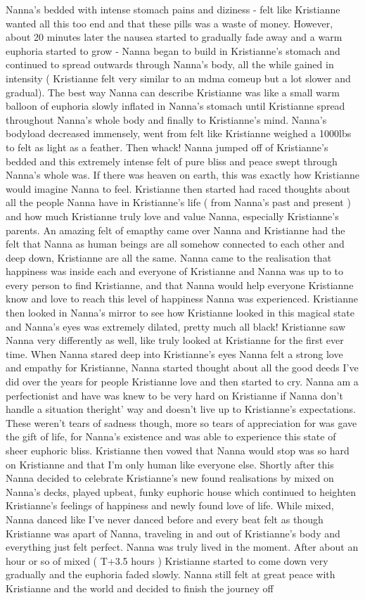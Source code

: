 \documentclass[12pt]{book}
\begin{document}
Nanna's bedded with intense stomach pains and diziness - felt like Kristianne wanted all this too end and that these pills was a waste of money. However, about 20 minutes later the nausea started to gradually fade away and a warm euphoria started to grow - Nanna began to build in Kristianne's stomach and continued to spread outwards through Nanna's body, all the while gained in intensity ( Kristianne felt very similar to an mdma comeup but a lot slower and gradual). The best way Nanna can describe Kristianne was like a small warm balloon of euphoria slowly inflated in Nanna's stomach until Kristianne spread throughout Nanna's whole body and finally to Kristianne's mind. Nanna's bodyload decreased immensely, went from felt like Kristianne weighed a 1000lbs to felt as light as a feather. Then whack! Nanna jumped off of Kristianne's bedded and this extremely intense felt of pure bliss and peace swept through Nanna's whole was. If there was heaven on earth, this was exactly how Kristianne would imagine Nanna to feel. Kristianne then started had raced thoughts about all the people Nanna have in Kristianne's life ( from Nanna's past and present ) and how much Kristianne truly love and value Nanna, especially Kristianne's parents. An amazing felt of emapthy came over Nanna and Kristianne had the felt that Nanna as human beings are all somehow connected to each other and deep down, Kristianne are all the same. Nanna came to the realisation that happiness was inside each and everyone of Kristianne and Nanna was up to to every person to find Kristianne, and that Nanna would help everyone Kristianne know and love to reach this level of happiness Nanna was experienced. Kristianne then looked in Nanna's mirror to see how Kristianne looked in this magical state and Nanna's eyes was extremely dilated, pretty much all black! Kristianne saw Nanna very differently as well, like truly looked at Kristianne for the first ever time. When Nanna stared deep into Kristianne's eyes Nanna felt a strong love and empathy for Kristianne, Nanna started thought about all the good deeds I've did over the years for people Kristianne love and then started to cry. Nanna am a perfectionist and have was knew to be very hard on Kristianne if Nanna don't handle a situation theright' way and doesn't live up to Kristianne's expectations. These weren't tears of sadness though, more so tears of appreciation for was gave the gift of life, for Nanna's existence and was able to experience this state of sheer euphoric bliss. Kristianne then vowed that Nanna would stop was so hard on Kristianne and that I'm only human like everyone else. Shortly after this Nanna decided to celebrate Kristianne's new found realisations by mixed on Nanna's decks, played upbeat, funky euphoric house which continued to heighten Kristianne's feelings of happiness and newly found love of life. While mixed, Nanna danced like I've never danced before and every beat felt as though Kristianne was apart of Nanna, traveling in and out of Kristianne's body and everything just felt perfect. Nanna was truly lived in the moment. After about an hour or so of mixed ( T+3.5 hours ) Kristianne started to come down very gradually and the euphoria faded slowly. Nanna still felt at great peace with Kristianne and the world and decided to finish the journey off 
\end{document}
